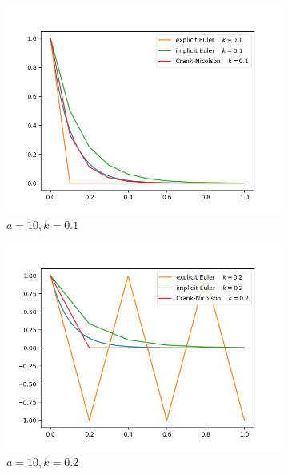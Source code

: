 \documentclass{article}
\begin{document}
\begin{figure}
  \centering
  \begin{subfigure}[b]{.49\linewidth}
      \includegraphics[scale=.4]{4c-ivp-a10-k0-1.png}
      \caption{$a=10, k=0.1$}
  \end{subfigure}
  \begin{subfigure}[b]{.49\linewidth}
      \includegraphics[scale=.4]{4c-ivp-a10-k0-2.png}
      \caption{$a=10, k=0.2$}
  \end{subfigure}
  \hfill
  \begin{subfigure}[b]{.49\linewidth}

\end{subfigure}
\end{figure}
\end{document}
